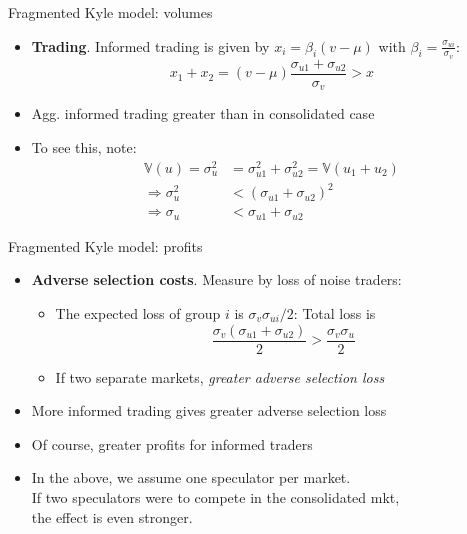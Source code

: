 \documentclass[english,10pt
,aspectratio=169
]{beamer}
\begin{document}
\begin{frame}{Fragmented Kyle model: volumes}
	\begin{itemize}
		\item \textbf{Trading}. Informed trading is given by $x_i= \beta_i (v-\mu)$ with $\beta_i= \frac{\sigma_{ui}}{\sigma_{v}}$:
		\[
			x_1+x_2=(v-\mu)\frac{\sigma_{u1}+\sigma_{u2}}{\sigma_v}>x
		\]
		
		\item \alert{Agg. informed trading greater than in consolidated case}
		
		\item To see this, note: 
		\begin{align*}
			\mathbb{V}(u) = \sigma_u^2 &= \sigma_{u1}^2 + \sigma_{u2}^2 = \mathbb{V}(u_1+u_2)
			\\
			\Rightarrow
			\sigma_u^2 &< (\sigma_{u1} + \sigma_{u2})^2
			\\
			\Rightarrow
			\sigma_u &< \sigma_{u1} + \sigma_{u2}
		\end{align*}
	\end{itemize}
\end{frame}


\begin{frame}{Fragmented Kyle model: profits}
	\begin{itemize}
		\item \textbf{Adverse selection costs}. Measure by loss of noise traders:
		\begin{itemize}
			\item The expected loss of group $i$ is $\sigma_{v} \sigma_{ui}/2$: Total loss is 
			\[
			\frac{\sigma_{v}(\sigma_{u1}+\sigma_{u2})}{2} > \frac{\sigma_{v} \sigma_{u}}{2}
			\]
			\item If two separate markets, \textit{greater adverse selection loss}
		\end{itemize}
		
		\item \alert{More informed trading gives greater adverse selection loss}
		
		\item Of course, greater profits for informed traders
		
		\item In the above, we assume one speculator per market. \\
		If two speculators were to compete in the consolidated mkt, \\
		the effect is even stronger.
	\end{itemize}
\end{frame}
\end{document}
